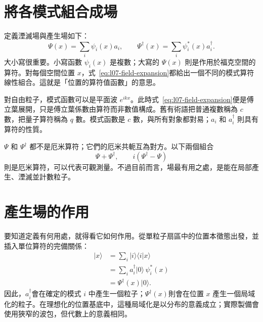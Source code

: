 \section{將各模式組合成場}

定義湮滅場與產生場如下：
\begin{equation}
\Psi(x)=\sum_i \psi_i(x)a_i,
\qquad
\Psi^\dagger(x)=\sum_i \psi_i^*(x)a_i^\dagger.
\label{eq:l07-field-expansion}
\end{equation}
大小寫很重要。小寫函數 \(\psi_i(x)\) 是複數；大寫的 \(\Psi(x)\) 則是作用於福克空間的算符。對每個空間位置 \(x\)，式~\eqref{eq:l07-field-expansion}都給出一個不同的模式算符線性組合。這就是「位置的算符值函數」的意思。

對自由粒子，模式函數可以是平面波 \(e^{ikx}\)。此時式~\eqref{eq:l07-field-expansion}便是傅立葉展開，只是傅立葉係數由算符而非數值構成。舊有術語把普通複數稱為 \(c\) 數，把量子算符稱為 \(q\) 數。模式函數是 \(c\) 數，與所有對象都對易；\(a_i\) 和 \(a_i^\dagger\) 則具有算符的性質。

\(\Psi\) 和 \(\Psi^\dagger\) 都不是厄米算符；它們的厄米共軛互為對方。以下兩個組合
\begin{equation}
\Psi+\Psi^\dagger,
\qquad
i(\Psi^\dagger-\Psi)
\label{eq:l07-hermitian-combinations}
\end{equation}
則是厄米算符，可以代表可觀測量。不過目前而言，場最有用之處，是能在局部產生、湮滅並計數粒子。

\begin{classroomqa}
\end{classroomqa}

\section{產生場的作用}

要知道定義有何用處，就得看它如何作用。從單粒子扇區中的位置本徵態出發，並插入單位算符的完備關係：
\begin{align}
|x\rangle
&=\sum_i |i\rangle\langle i|x\rangle \\
&=\sum_i a_i^\dagger|0\rangle\,\psi_i^*(x) \\
&=\Psi^\dagger(x)|0\rangle.
\label{eq:l07-local-creation}
\end{align}
因此，\(a_i^\dagger\)會在確定的模式 \(i\) 中產生一個粒子；\(\Psi^\dagger(x)\)則會在位置 \(x\) 產生一個局域化的粒子。在理想化的位置基底中，這種局域化是以分布的意義成立；實際製備會使用狹窄的波包，但代數上的意義相同。

